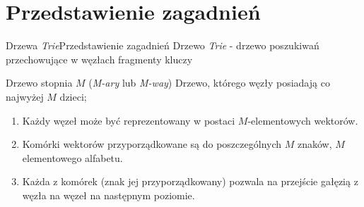 \documentclass[aspectratio=1610,english]{beamer} %
\begin{document}
  	\section{Przedstawienie zagadnień}
	\begin{frame}{Drzewa \emph{Trie}}{Przedstawienie zagadnień}
	   {\color{AGH@green}Drzewo \emph{Trie}} - drzewo poszukiwań przechowujące w węzłach fragmenty kluczy \newline
    	        {   \small \color{gray}
        	        Drzewo stopnia $M$ {\color{gray} {\color{gray}(\emph{M-ary} lub \emph{M-way})}} \newline
                    {   \scriptsize \color{lightgray}
                        \hspace*{0.9cm} Drzewo, którego węzły posiadają co najwyżej $M$ dzieci;
                    }
    	            \begin{enumerate} 
    	                \footnotesize \color{gray}
    	                \item Każdy węzeł może być reprezentowany w postaci $M$-elementowych wektorów.
        	            \item Komórki wektorów przyporządkowane są do poszczególnych $M$ znaków, \newline 
        	            $M$ elementowego alfabetu.
        	            \item Każda z komórek {\color{lightgray}(znak jej przyporządkowany)} pozwala na przejście gałęzią z węzła na węzeł na następnym poziomie.
    	            \end{enumerate}
    	        }
	       \vspace*{-0.7cm}
        	    \begin{figure}[H]
\end{figure}
\end{frame}
\end{document}
